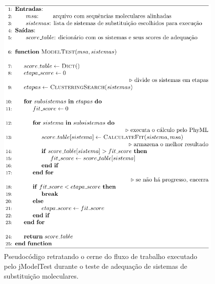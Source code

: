 \documentclass[english,brazilian]{UNISINOSmonografia} %
\begin{document}
\begin{figure}[tbp]
	\centering%
	\begin{minipage}{\textwidth}
		\caption{Pseudocódigo retratando o cerne do fluxo de trabalho executado pelo jModelTest durante o teste de adequação de sistemas de substituição moleculares.}
		\label{fig:modelo-jmodel-algo}
		\includegraphics[width=\textwidth]{modelo-jmodel-algo}
	\end{minipage}
\end{figure}
\end{document}
